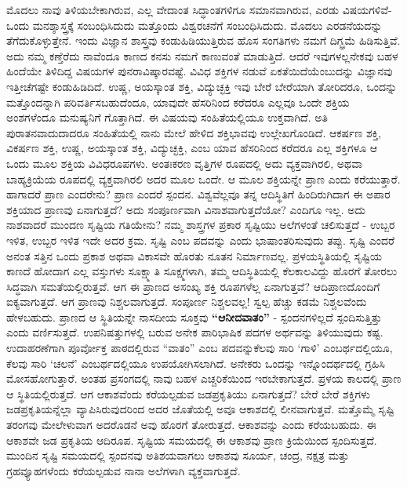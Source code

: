 ಮೊದಲು ನಾವು ತಿಳಿಯಬೇಕಾಗಿರುವ, ಎಲ್ಲ ವೇದಾಂತ ಸಿದ್ಧಾಂತಗಳಿಗೂ ಸಮಾನವಾಗಿರುವ, ಎರಡು ವಿಷಯಗಳಿವೆ-ಒಂದು ಮನಶ್ಶಾಸ್ತ್ರಕ್ಕೆ ಸಂಬಂಧಿಸಿದುದು ಮತ್ತೊಂದು ವಿಶ್ವರಚನೆಗೆ ಸಂಬಂಧಿಸಿದುದು. ಮೊದಲು ಎರಡನೆಯದನ್ನು ತೆಗೆದುಕೊಳ್ಳುತ್ತೇನೆ. ಇಂದು ವಿಜ್ಞಾನ ಶಾಸ್ತ್ರವು ಕಂಡುಹಿಡಿಯುತ್ತಿರುವ ಹೊಸ ಸಂಗತಿಗಳು ನಮಗೆ ದಿಗ್ಭ್ರಮೆ ಹಿಡಿಸುತ್ತಿವೆ. ಅದು ನಮ್ಮ ಕಣ್ತೆರೆದು ನಾವೆಂದೂ ಕಾಣದ ಕನಸು ನಮಗೆ ಕಾಣುವಂತೆ ಮಾಡುತ್ತಿದೆ. ಆದರೆ ಇವುಗಳಲ್ಲನೇಕವು ಬಹಳ ಹಿಂದೆಯೇ ತಿಳಿದಿದ್ದ ವಿಷಯಗಳ ಪುನರಾವಿಷ್ಕಾರವಷ್ಟೆ. ವಿವಿಧ ಶಕ್ತಿಗಳ ನಡುವೆ ಏಕತೆಯಿದೆಯೆಂಬುದನ್ನು ವಿಜ್ಞಾನವು ಇತ್ತೀಚೆಗಷ್ಟೇ ಕಂಡುಹಿಡಿದಿದೆ. ಉಷ್ಣ, ಅಯಸ್ಕಾಂತ ಶಕ್ತಿ, ವಿದ್ಯುಚ್ಛಕ್ತಿ ಇವು ಬೇರೆ ಬೇರೆಯಾಗಿ ತೋರಿದರೂ, ಒಂದನ್ನು ಮತ್ತೊಂದನ್ನಾಗಿ ಪರಿವರ್ತಿಸಬಹುದೆಂದೂ, ಯಾವುದೇ ಹೆಸರಿನಿಂದ ಕರೆದರೂ ಎಲ್ಲವೂ ಒಂದೇ ಶಕ್ತಿಯ ಅಂಶಗಳೆಂದೂ ಮನುಷ್ಯನಿಗೆ ಗೊತ್ತಾಗಿದೆ. ಈ ವಿಷಯವು ಸಂಹಿತೆಯಲ್ಲಿಯೂ ಉಕ್ತವಾಗಿದೆ. ಅತಿ ಪುರಾತನವಾದುದಾದರೂ ಸಂಹಿತೆಯಲ್ಲಿ ನಾನು ಮೇಲೆ ಹೇಳಿದ ಶಕ್ತಿಭಾವವು ಉಲ್ಲೇಖಗೊಂಡಿದೆ. ಆಕರ್ಷಣ ಶಕ್ತಿ, ವಿಕರ್ಷಣ ಶಕ್ತಿ, ಉಷ್ಣ, ಅಯಸ್ಕಾಂತ ಶಕ್ತಿ, ವಿದ್ಯುಚ್ಛಕ್ತಿ, ಎಂಬ ಯಾವ ಹೆಸರಿನಿಂದ ಕರೆದರೂ ಎಲ್ಲ ಶಕ್ತಿಗಳೂ ಆ ಒಂದು ಮೂಲ ಶಕ್ತಿಯ ವಿವಿಧರೂಪಗಳು. ಅಂತಃಕರಣ ವೃತ್ತಿಗಳ ರೂಪದಲ್ಲಿ ಅದು ವ್ಯಕ್ತವಾಗಿರಲಿ, ಅಥವಾ ಬಾಹ್ಯಕ್ರಿಯೆಯ ರೂಪದಲ್ಲಿ ವ್ಯಕ್ತವಾಗಿರಲಿ ಅದರ ಮೂಲ ಒಂದೇ. ಆ ಮೂಲ ಶಕ್ತಿಯನ್ನೇ ಪ್ರಾಣ ಎಂದು ಕರೆಯುತ್ತಾರೆ. ಹಾಗಾದರೆ ಪ್ರಾಣ ಎಂದರೇನು? ಪ್ರಾಣ ಎಂದರೆ ಸ್ಪಂದನ. ವಿಶ್ವವೆಲ್ಲವೂ ತನ್ನ ಆದಿಸ್ಥಿತಿಗೆ ಹಿಂದಿರುಗಿದಾಗ ಈ ಅಪಾರ ಶಕ್ತಿಯಾದ ಪ್ರಾಣವು ಏನಾಗುತ್ತದೆ? ಅದು ಸಂಪೂರ್ಣವಾಗಿ ವಿನಾಶವಾಗುತ್ತದೆಯೋ? ಎಂದಿಗೂ ಇಲ್ಲ. ಅದು ನಾಶವಾದರೆ ಮುಂದಣ ಸೃಷ್ಟಿಯ ಗತಿಯೇನು? ನಮ್ಮ ಶಾಸ್ತ್ರಗಳ ಪ್ರಕಾರ ಸೃಷ್ಟಿಯು ಅಲೆಗಳಂತೆ ಚಲಿಸುತ್ತದೆ - ಉಬ್ಬರ ಇಳಿತ, ಉಬ್ಬರ ಇಳಿತ ಇದೇ ಅದರ ಕ್ರಮ. ಸೃಷ್ಟಿ ಎಂಬ ಪದವನ್ನು  ಎಂದು ಭಾಷಾಂತರಿಸುವುದು ತಪ್ಪು. ಸೃಷ್ಟಿ ಎಂದರೆ ಅನಂತ ಸತ್ತಿನ ಒಂದು ಪ್ರಕಾಶ ಅಥವಾ ವಿಕಾಸವೇ ಹೊರತು ನೂತನ ನಿರ್ಮಾಣವಲ್ಲ. ಪ್ರಳಯಸ್ಥಿತಿಯಲ್ಲಿ ಸೃಷ್ಟಿಯ ಕಾಣದೆ ಹೋದಾಗ ಎಲ್ಲ ವಸ್ತುಗಳು ಸೂಕ್ಷ್ಮಾತಿ ಸೂಕ್ಷ್ಮಗಳಾಗಿ, ತಮ್ಮ ಆದಿಸ್ಥಿತಿಯಲ್ಲಿ ಕೆಲಕಾಲವಿದ್ದು ಹೊರಗೆ ತೋರಲು ಸಿದ್ಧವಾಗಿ ಸಮತೆಯಲ್ಲಿರುತ್ತವೆ. ಆಗ ಈ ಪ್ರಾಣದ ಅಸಂಖ್ಯ ಶಕ್ತಿ ರೂಪಗಳೆಲ್ಲ ಏನಾಗುತ್ತವೆ? ಆದಿಪ್ರಾಣದೊಂದಿಗೆ ಐಕ್ಯವಾಗುತ್ತದೆ. ಆಗ ಪ್ರಾಣವು ನಿಶ್ಚಲವಾಗುತ್ತದೆ. ಸಂಪೂರ್ಣ ನಿಶ್ಚಲವಲ್ಲ! ಸ್ವಲ್ಪ ಹೆಚ್ಚು ಕಡಮೆ ನಿಶ್ಚಲವೆಂದು ಹೇಳಬಹುದು. ಪ್ರಾಣದ ಆ ಸ್ಥಿತಿಯನ್ನೇ ನಾಸದೀಯ ಸೂಕ್ತವು \textbf{“ಆನೀದವಾತಂ”} - ಸ್ಪಂದನಗಳಿಲ್ಲದೆ ಸ್ಪಂದಿಸುತ್ತಿತ್ತು ಎಂದು ವರ್ಣಿಸುತ್ತದೆ. ಉಪನಿಷತ್ತುಗಳಲ್ಲಿ ಬರುವ ಅನೇಕ ಪಾರಿಭಾಷಿಕ ಪದಗಳ ಅರ್ಥವನ್ನು ತಿಳಿಯುವುದು ಕಷ್ಟ. ಉದಾಹರಣೆಗಾಗಿ ಪೂರ್ವೋಕ್ತ ಪಾಠದಲ್ಲಿರುವ “ವಾತಂ” ಎಂಬ ಪದವನ್ನುಕೆಲವು ಸಾರಿ ‘ಗಾಳಿ’ ಎಂಬರ್ಥದಲ್ಲಿಯೂ, ಕೆಲವು ಸಾರಿ ‘ಚಲನೆ’ ಎಂಬರ್ಥದಲ್ಲಿಯೂ ಉಪಯೋಗಿಸಲಾಗಿದೆ. ಅನೇಕರು ಒಂದನ್ನು ಇನ್ನೊಂದರ್ಥದಲ್ಲಿ ಗ್ರಹಿಸಿ ಮೋಸಹೋಗುತ್ತಾರೆ. ಅಂತಹ ಪ್ರಸಂಗದಲ್ಲಿ ನಾವು ಬಹಳ ಎಚ್ಚರಿಕೆಯಿಂದ ಇರಬೇಕಾಗುತ್ತದೆ. ಪ್ರಳಯ ಕಾಲದಲ್ಲಿ ಪ್ರಾಣ ಆ ಸ್ಥಿತಿಯಲ್ಲಿರುತ್ತದೆ. ಆಗ ಆಕಾಶವೆಂದು ಕರೆಯಲ್ಪಡುವ ಜಡಪ್ರಕೃತಿಯು ಏನಾಗುತ್ತದೆ? ಬೇರೆ ಬೇರೆ ಶಕ್ತಿಗಳು ಜಡಪ್ರಕೃತಿಯನ್ನೆಲ್ಲಾ ವ್ಯಾಪಿಸಿರುವುದರಿಂದ ಅದರ ಜೊತೆಯಲ್ಲಿ ಅವೂ ಆಕಾಶದಲ್ಲಿ ಲೀನವಾಗುತ್ತವೆ. ಮತ್ತೊಮ್ಮೆ ಸೃಷ್ಟಿ ತರಂಗವು ಮೇಲೇಳುವಾಗ ಅದರೊಡನೆ ಅವು ಹೊರಗೆ ತೋರುತ್ತದೆ. ಆಕಾಶವನ್ನು  ಎಂದು ಕರೆಯಬಹುದು. ಈ ಆಕಾಶವೇ ಜಡ ಪ್ರಕೃತಿಯ ಆದಿರೂಪ. ಸೃಷ್ಟಿಯ ಸಮಯದಲ್ಲಿ ಈ ಆಕಾಶವು ಪ್ರಾಣ ಕ್ರಿಯೆಯಿಂದ ಸ್ಪಂದಿಸುತ್ತದೆ. ಮುಂದಿನ ಸೃಷ್ಟಿ ಸಮಯದಲ್ಲಿ ಸ್ಪಂದನವು ಅತಿಶಯವಾಗಲು ಆಕಾಶವು ಸೂರ್ಯ, ಚಂದ್ರ, ನಕ್ಷತ್ರ ಮತ್ತು ಗ್ರಹವ್ಯೂಹಗಳೆಂದು ಕರೆಯಲ್ಪಡುವ ನಾನಾ ಅಲೆಗಳಾಗಿ ವ್ಯಕ್ತವಾಗುತ್ತದೆ.

